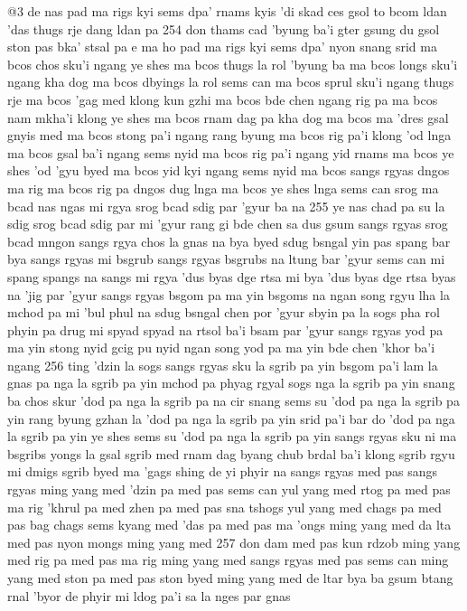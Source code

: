 @3
de nas pad ma rigs kyi sems dpa' rnams kyis 'di skad ces gsol to
bcom ldan 'das thugs rje dang ldan pa
254
don thams cad 'byung ba'i gter gsung du gsol
ston pas bka' stsal pa
e ma ho
pad ma rigs kyi sems dpa' nyon
snang srid ma bcos chos sku'i ngang
ye shes ma bcos thugs la rol
'byung ba ma bcos longs sku'i ngang
kha dog ma bcos dbyings la rol
sems can ma bcos sprul sku'i ngang
thugs rje ma bcos 'gag med klong
kun gzhi ma bcos bde chen ngang
rig pa ma bcos nam mkha'i klong
ye shes ma bcos rnam dag pa
kha dog ma bcos ma 'dres gsal
gnyis med ma bcos stong pa'i ngang
rang byung ma bcos rig pa'i klong
'od lnga ma bcos gsal ba'i ngang
sems nyid ma bcos rig pa'i ngang
yid rnams ma bcos ye shes 'od
'gyu byed ma bcos yid kyi ngang
sems nyid ma bcos sangs rgyas dngos
ma rig ma bcos rig pa dngos
dug lnga ma bcos ye shes lnga
sems can srog ma bcad nas ngas mi rgya
srog bcad sdig par 'gyur ba na
255
ye nas chad pa su la sdig
srog bcad sdig par mi 'gyur rang gi bde chen sa
dus gsum sangs rgyas srog bcad mngon sangs rgya
chos la gnas na bya byed sdug bsngal yin pas spang bar bya
sangs rgyas mi bsgrub sangs rgyas bsgrubs na ltung bar 'gyur
sems can mi spang spangs na sangs mi rgya
'dus byas dge rtsa mi bya 'dus byas dge rtsa byas na 'jig par 'gyur
sangs rgyas bsgom pa ma yin bsgoms na ngan song rgyu
lha la mchod pa mi 'bul phul na sdug bsngal chen por 'gyur
sbyin pa la sogs pha rol phyin pa drug mi spyad
spyad na rtsol ba'i bsam par 'gyur
sangs rgyas yod pa ma yin stong nyid gcig pu nyid
ngan song yod pa ma yin bde chen 'khor ba'i ngang
256
ting 'dzin la sogs sangs rgyas sku la sgrib pa yin
bsgom pa'i lam la gnas pa nga la sgrib pa yin
mchod pa phyag rgyal sogs nga la sgrib pa yin
snang ba chos skur 'dod pa nga la sgrib pa na
cir snang sems su 'dod pa nga la sgrib pa yin
rang byung gzhan la 'dod pa nga la sgrib pa yin
srid pa'i bar do 'dod pa nga la sgrib pa yin
ye shes sems su 'dod pa nga la sgrib pa yin
sangs rgyas sku ni ma bsgribs yongs la gsal
sgrib med rnam dag byang chub brdal ba'i klong
sgrib rgyu mi dmigs sgrib byed ma 'gags shing
de yi phyir na sangs rgyas med pas sangs rgyas ming yang med
'dzin pa med pas sems can yul yang med
rtog pa med pas ma rig 'khrul pa med
zhen pa med pas sna tshogs yul yang med
chags pa med pas bag chags sems kyang med
'das pa med pas ma 'ongs ming yang med
da lta med pas nyon mongs ming yang med
257
don dam med pas kun rdzob ming yang med
rig pa med pas ma rig ming yang med
sangs rgyas med pas sems can ming yang med
ston pa med pas ston byed ming yang med
de ltar bya ba gsum btang rnal 'byor de
phyir mi ldog pa'i sa la nges par gnas
